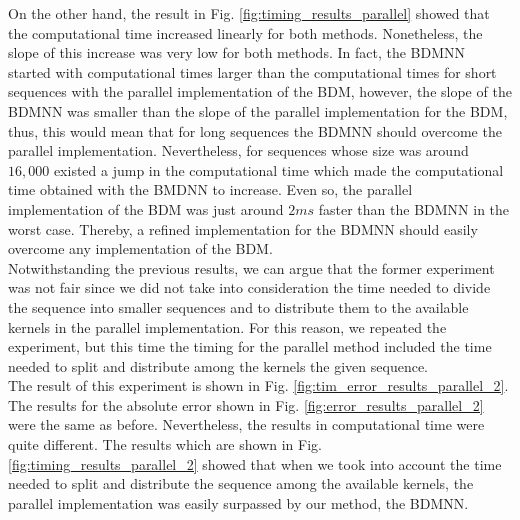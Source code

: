 On the other hand, the result in Fig. \ref{fig:timing_results_parallel} showed that the computational time increased linearly for both methods. Nonetheless, the slope of this increase was very low for both methods. In fact, the BDMNN started with computational times larger than the computational times for short sequences with the parallel implementation of the BDM, however, the slope of the BDMNN was smaller than the slope of the parallel implementation for the BDM, thus, this would mean that for long sequences the BDMNN should overcome the parallel implementation. Nevertheless, for sequences whose size was around $16,000$ existed a jump in the computational time which made the computational time obtained with the BMDNN to increase. Even so, the parallel implementation of the BDM was just around $2ms$ faster than the BDMNN in the worst case. Thereby, a refined implementation for the BDMNN should easily overcome any implementation of the BDM.\\

Notwithstanding the previous results, we can argue that the former experiment was not fair since we did not take into consideration the time needed to divide the sequence into smaller sequences and to distribute them to the available kernels in the parallel implementation. For this reason, we repeated the experiment, but this time the timing for the parallel method included the time needed to split and distribute among the kernels the given sequence.\\

The result of this experiment is shown in Fig. \ref{fig:tim_error_results_parallel_2}. The results for the absolute error shown in Fig. \ref{fig:error_results_parallel_2} were the same as before. Nevertheless, the results in computational time were quite different. The results which are shown in Fig. \ref{fig:timing_results_parallel_2} showed that when we took into account the time needed to split and distribute the sequence among the available kernels, the parallel implementation was easily surpassed by our method, the BDMNN.

